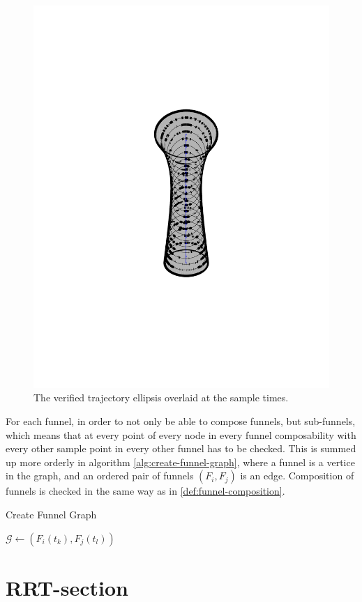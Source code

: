 \begin{figure}
\begin{minipage}[b]{0.4\textwidth}
    \includegraphics[width=\textwidth]{figures/method/funnel-sampled}
    \caption{The verified trajectory ellipsis overlaid at the sample times.}
  \end{minipage}
\end{figure}

For each funnel, in order to not only be able to compose funnels, but
sub-funnels, which means that at every point of every node in every funnel
composability with every other sample point in every other funnel has to be
checked. This is summed up more orderly in algorithm
\ref{alg:create-funnel-graph}, where a funnel is a vertice in the graph, and an
ordered pair of funnels \(\left( F_{i}, F_{j} \right)\) is an edge. Composition
of funnels is checked in the same way as in \ref{def:funnel-composition}.

\begin{algorithm}
  \caption{Create Funnel Graph}
  \label{alg:create-funnel-graph}
  \DontPrintSemicolon \SetAlgoNoLine

   

   {  {
       {  {
           { \(\mathcal{G}
            \leftarrow{} \left( F_{i}(t_{k}), F_{j}(t_{l}) \right)\) } \; } \; }
      \; }\; }\;

\end{algorithm}

\section{RRT-section}

